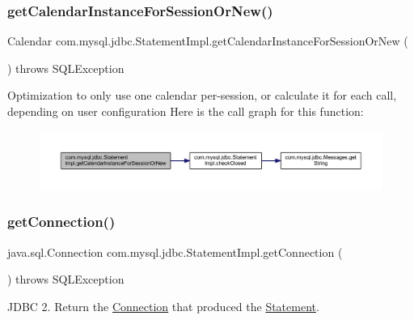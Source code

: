 \subsubsection{\texorpdfstring{get\+Calendar\+Instance\+For\+Session\+Or\+New()}{getCalendarInstanceForSessionOrNew()}}
{\footnotesize\ttfamily Calendar com.\+mysql.\+jdbc.\+Statement\+Impl.\+get\+Calendar\+Instance\+For\+Session\+Or\+New (\begin{DoxyParamCaption}{ }\end{DoxyParamCaption}) throws S\+Q\+L\+Exception\hspace{0.3cm}{\ttfamily [protected]}}

Optimization to only use one calendar per-\/session, or calculate it for each call, depending on user configuration Here is the call graph for this function\+:
\nopagebreak
\begin{figure}[H]
\begin{center}
\leavevmode
\includegraphics[width=350pt]{classcom_1_1mysql_1_1jdbc_1_1_statement_impl_a687b9b26a0936a0d3c1e7466e2e2ffc2_cgraph}
\end{center}
\end{figure}
\mbox{\label{classcom_1_1mysql_1_1jdbc_1_1_statement_impl_ab4532353069891f565129efa3b648433}} 
\subsubsection{\texorpdfstring{get\+Connection()}{getConnection()}}
{\footnotesize\ttfamily java.\+sql.\+Connection com.\+mysql.\+jdbc.\+Statement\+Impl.\+get\+Connection (\begin{DoxyParamCaption}{ }\end{DoxyParamCaption}) throws S\+Q\+L\+Exception}

J\+D\+BC 2. Return the \mbox{\hyperlink{interfacecom_1_1mysql_1_1jdbc_1_1_connection}{Connection}} that produced the \mbox{\hyperlink{interfacecom_1_1mysql_1_1jdbc_1_1_statement}{Statement}}.

